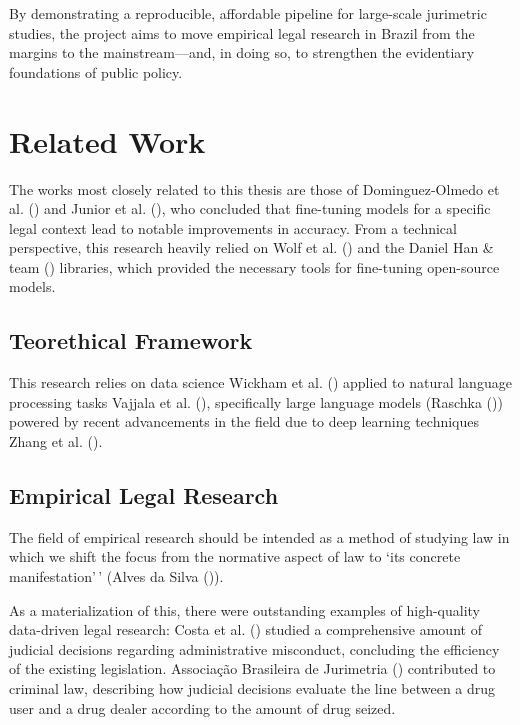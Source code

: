 \documentclass[
  12pt,
]{article}
\begin{document}
By demonstrating a reproducible, affordable pipeline for large-scale
jurimetric studies, the project aims to move empirical legal research in
Brazil from the margins to the mainstream---and, in doing so, to
strengthen the evidentiary foundations of public policy.

\section{Related Work}\label{related-work}

The works most closely related to this thesis are those of
Dominguez-Olmedo et al.
() and Junior et al.
(), who concluded that fine-tuning
models for a specific legal context lead to notable improvements in
accuracy. From a technical perspective, this research heavily relied on
Wolf et al. () and the Daniel
Han \& team () libraries,
which provided the necessary tools for fine-tuning open-source models.

\subsection{Teorethical Framework}\label{sec-teorethical-framework}

This research relies on data science Wickham et al.
() applied to natural language
processing tasks Vajjala et al.
(), specifically large
language models (Raschka ())
powered by recent advancements in the field due to deep learning
techniques Zhang et al. ().

\subsection{Empirical Legal Research}\label{empirical-legal-research}

The field of empirical research should be intended as a method of
studying law in which we shift the focus from the normative aspect of
law to `its concrete manifestation'\,' (Alves da Silva
()).

As a materialization of this, there were outstanding examples of
high-quality data-driven legal research: Costa et al.
() studied a comprehensive
amount of judicial decisions regarding administrative misconduct,
concluding the efficiency of the existing legislation. Associação
Brasileira de Jurimetria
()
contributed to criminal law, describing how judicial decisions evaluate
the line between a drug user and a drug dealer according to the amount
of drug seized.
\end{document}
